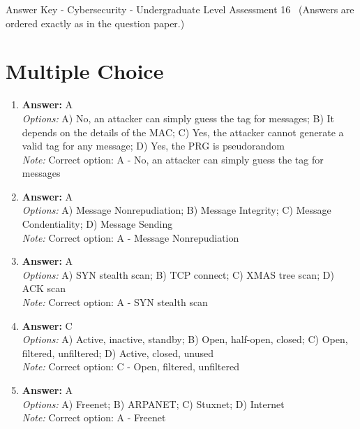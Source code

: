 \documentclass[12pt]{article}
\begin{document}
\begin{center}
Answer Key - Cybersecurity - Undergraduate Level Assessment 16 \
\small (Answers are ordered exactly as in the question paper.)
\end{center}

\section*{Multiple Choice}
\begin{enumerate}[label=\arabic*.]
\item \textbf{Answer:} A
\\ \textit{Options:} A) No, an attacker can simply guess the tag for messages; B) It depends on the details of the MAC; C) Yes, the attacker cannot generate a valid tag for any message; D) Yes, the PRG is pseudorandom
\\ \textit{Note:} Correct option: A - No, an attacker can simply guess the tag for messages
\item \textbf{Answer:} A
\\ \textit{Options:} A) Message Nonrepudiation; B) Message Integrity; C) Message Condentiality; D) Message Sending
\\ \textit{Note:} Correct option: A - Message Nonrepudiation
\item \textbf{Answer:} A
\\ \textit{Options:} A) SYN stealth scan; B) TCP connect; C) XMAS tree scan; D) ACK scan
\\ \textit{Note:} Correct option: A - SYN stealth scan
\item \textbf{Answer:} C
\\ \textit{Options:} A) Active, inactive, standby; B) Open, half-open, closed; C) Open, filtered, unfiltered; D) Active, closed, unused
\\ \textit{Note:} Correct option: C - Open, filtered, unfiltered
\item \textbf{Answer:} A
\\ \textit{Options:} A) Freenet; B) ARPANET; C) Stuxnet; D) Internet
\\ \textit{Note:} Correct option: A - Freenet
\end{enumerate}
\end{document}

